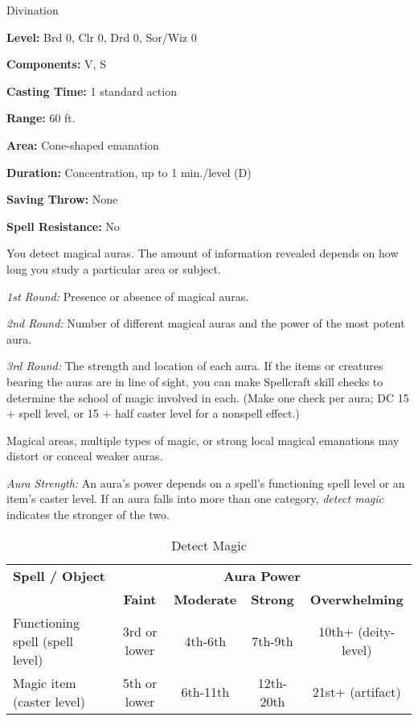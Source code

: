 
Divination

\textbf{Level:} Brd 0, Clr 0, Drd 0, Sor/Wiz 0

\textbf{Components:} V, S

\textbf{Casting Time:} 1 standard action

\textbf{Range:} 60 ft.

\textbf{Area:} Cone-shaped emanation

\textbf{Duration:} Concentration, up to 1 min./level (D)

\textbf{Saving Throw:} None

\textbf{Spell Resistance:} No

You detect magical auras. The amount of information revealed depends on how long 
you study a particular area or subject.

\textit{1st Round:} Presence or absence of magical auras.

\textit{2nd Round:} Number of different magical auras and the power of the most 
potent aura.

\textit{3rd Round:} The strength and location of each aura. If the items or creatures 
bearing the auras are in line of sight, you can make Spellcraft skill checks to 
determine the school of magic involved in each. (Make one check per aura; DC 15 
+ spell level, or 15 + half caster level for a nonspell effect.)

Magical areas, multiple types of magic, or strong local magical emanations may 
distort or conceal weaker auras.

\textit{Aura Strength:} An aura's power depends on a spell's functioning spell 
level or an item's caster level. If an aura falls into more than one category, 
\textit{detect magic} indicates the stronger of the two.

\begin{table}[htb]
\caption{Detect Magic}
\centering
\begin{tabular}{l c c c c}
\textbf{Spell / Object} & \multicolumn{4}{c}{\textbf{Aura Power}}\\
 & \textbf{Faint} & \textbf{Moderate} & \textbf{Strong} & \textbf{Overwhelming}\\
Functioning spell (spell level) & 3rd or lower & 4th-6th & 7th-9th & 10th+ (deity-level)\\
Magic item (caster level) & 5th or lower & 6th-11th & 12th-20th & 21st+ (artifact)\\
\end{tabular}
\end{table}


